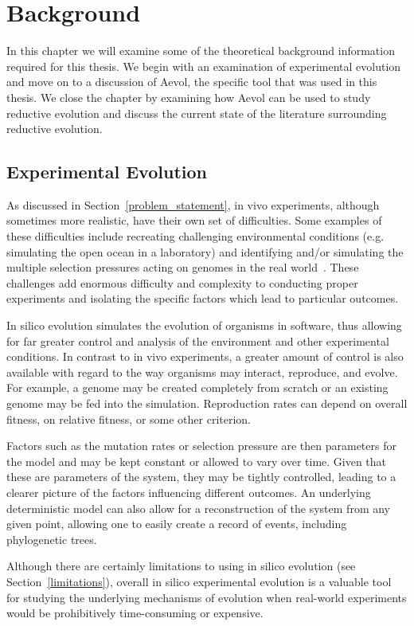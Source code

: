 \chapter{Background}\label{ch:background}
In this chapter we will examine some of the theoretical background information required for this thesis. We begin with an examination of experimental evolution and move on to a discussion of Aevol, the specific tool that was used in this thesis. We close the chapter by examining how Aevol can be used to study reductive evolution and discuss the current state of the literature surrounding reductive evolution.  

\section{Experimental Evolution}
As discussed in Section~\ref{problem_statement}, in vivo experiments, although sometimes more realistic, have their own set of difficulties. Some examples of these difficulties include recreating challenging environmental conditions (e.g. simulating the open ocean in a laboratory) and identifying and/or simulating the multiple selection pressures acting on genomes in the real world~\cite{Batut.2013}. These challenges add enormous difficulty and complexity to conducting proper experiments and isolating the specific factors which lead to particular outcomes. 

In silico evolution simulates the evolution of organisms in software, thus allowing for far greater control and analysis of the environment and other experimental conditions. In contrast to in vivo experiments, a greater amount of control is also available with regard to the way organisms may interact, reproduce, and evolve. For example, a genome may be created completely from scratch or an existing genome may be fed into the simulation. Reproduction rates can depend on overall fitness, on relative fitness, or some other criterion. 

Factors such as the mutation rates or selection pressure are then parameters for the model and may be kept constant or allowed to vary over time. Given that these are parameters of the system, they may be tightly controlled, leading to a clearer picture of the factors influencing different outcomes. An underlying deterministic model can also allow for a reconstruction of the system from any given point, allowing one to easily create a record of events, including phylogenetic trees. 

Although there are certainly limitations to using in silico evolution (see Section~\ref{limitations}), overall in silico experimental evolution is a valuable tool for studying the underlying mechanisms of evolution when real-world experiments would be prohibitively time-consuming or expensive.

